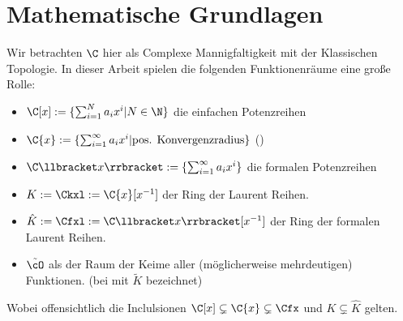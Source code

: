 \chapter{Mathematische Grundlagen}

\begin{comment}
Hier werde ich mich auf \cite{sabbah_cimpa90} und \cite{coutinho1995primer}
beziehen.
\end{comment}

Wir betrachten $\C$ hier als Complexe Mannigfaltigkeit mit der Klassischen
Topologie.
In dieser Arbeit spielen die folgenden Funktionenräume eine große Rolle:
\begin{itemize}
\item $\C[x]:=\{ \sum^{N}_{i=1}a_ix^i | N\in \N \}$ die einfachen Potenzreihen
\item $\C\{x\}:=\{ \sum^{\infty}_{i=1}a_ix^i | \mbox{pos.
Konvergenzradius}\}$ (\cite[Chap 5.1.1]{hotta2007d})
\item $\C\llbracket x\rrbracket:=\{ \sum^{\infty}_{i=1}a_ix^i \}$ die formalen
Potenzreihen
\item $K:=\Ckxl:=\C\{x\}[x^{-1}]$ der Ring der Laurent Reihen.
\item $\hat{K}:=\Cfxl:=\C\llbracket x\rrbracket[x^{-1}]$ der Ring der
formalen Laurent Reihen.
\item $\tilde\cO$ als der Raum der Keime aller (möglicherweise mehrdeutigen)
Funktionen. (bei \cite{hotta2007d} mit $\tilde K$ bezeichnet)
\end{itemize}
Wobei offensichtlich die Inclulsionen $\C[x]\subsetneq\C\{x\}\subsetneq\Cfx$
und $K\subsetneq\hat K$ gelten.

\begin{comment}
Es bezeichnet der Hut ($ \, \hat \,\, $) das jeweils formale äquivalent zu
einem konvergentem Objekt.
\end{comment}

\begin{comment}
\begin{lem}[Seite 2]
ein paar eigenschaften
\begin{enumerate}
\item $\C[x]$ ist ein graduierter Ring, durch die Grad der
Polynome. Diese graduierung induziert eine aufsteigende Filtrierung.

alle Ideale haben die form $(x-a)$ mit $a\in \C$
\item wenn $\mathfrak{m}$ das maximale Ideal von $\C[x]$ (erzeugt von
$x$ ist), so ist
\[
  \C[[x]]=
  \underset{k}{\underleftarrow{\lim}} \C[X]\backslash\mathfrak{m}^k
\]
The ring $\C[[x]]$ ist ein nöterscher lokaler Ring:
jede Potenzreihe mit konstantem term $\neq 0$ ist invertierbar.

Der ring ist ebenfalls ein diskreter ??? Ring (discrete valuation
ring)

Die Filtrierung nach grad des Maximalen Ideals, genannt
$\mathfrak{m}$-adische Fitration, ist die Filtrierung
$\mathfrak{m}^k=\{f\in \C[[x]]|v(f)\geq k\}$

und es gilt $gr_\mathfrak{m}(\C[[x]])=\C[x]$
\end{enumerate}
\end{lem}
\end{comment}

